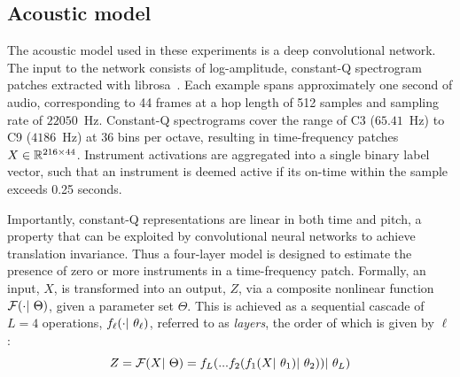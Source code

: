 \documentclass{article}
\begin{document}
\subsection{Acoustic model}

%
%

The acoustic model used in these experiments is a deep convolutional network.
The input to the network consists of log-amplitude, constant-Q spectrogram patches extracted with librosa~\cite{librosa}.
Each example spans approximately one second of audio, corresponding to 44 frames at a hop length of 512 samples and sampling rate of $22050$~Hz.
Constant-Q spectrograms cover the range of C3 ($65.41$~Hz) to C9 ($4186$~Hz) at 36 bins
per octave, resulting in time-frequency patches $X \in \mathbb{R}^{216\times44}$.
Instrument activations are aggregated into a single binary label vector, such that an instrument is deemed active if its on-time within the sample exceeds 0.25 seconds.

Importantly, constant-Q representations are linear in both time and pitch, a property that can be exploited by convolutional neural networks to achieve translation invariance.
Thus a four-layer model is designed to estimate the presence of zero or more instruments in a time-frequency patch.
Formally, an input, $X$, is transformed into an output, $Z$, via a composite nonlinear
function $\mathcal{F}(\cdot |~ \Theta)$, given a parameter set $\Theta$.
This is achieved as a sequential cascade of $L=4$ operations, $f_\ell(\cdot |~
\theta_\ell)$, referred to as \emph{layers}, the order of which is given by $\ell$:
\begin{equation}
\label{eq:layers}
Z = \mathcal{F}(X |~ \Theta) = f_{L}(  ... f_2(f_1(X |~ \theta_1) |~ \theta_2) )
 |~ \theta_{L})
\end{equation}
\end{document}
